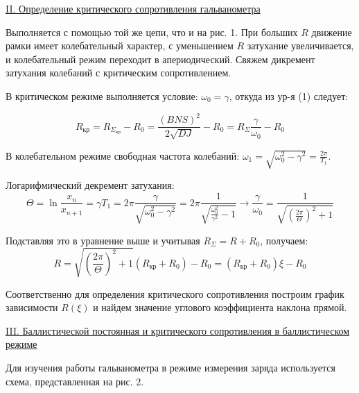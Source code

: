 \documentclass[a4paper]{article}
\begin{document}
\begin{center}
    \underline{\large {\RN{2}. Определение критического сопротивления гальванометра}}
\end{center}

Выполняется с помощью той же цепи, что и на рис. 1. При больших $R$ движение рамки имеет колебательный характер, с уменьшением $R$ затухание увеличивается, и колебательный режим переходит в апериодический. Свяжем дикремент затухания колебаний с критическим сопротивлением. \par

В критическом режиме выполняется условие: \(\omega_{0} = \gamma\), откуда из ур-я (1) следует:

\begin{equation*}
    R_{\text{кр}} = R_{\Sigma_{\text{кр}}} - R_{0} = \frac{(BNS)^{2}}{2\sqrt{DJ}} - R_{0} = R_{\Sigma} \frac{\gamma}{\omega_{0}} - R_{0}
\end{equation*}

В колебательном режиме свободная частота колебаний: \(\omega_{1} = \sqrt{\omega_{0}^{2} - \gamma^{2}} = \frac{2\pi}{T_{1}}\).

Логарифмический декремент затухания:
\begin{equation*}
    \Theta = \ln{\frac{x_{n}}{x_{n+1}}} = \gamma T_{1} = 2\pi \frac{\gamma}{\sqrt{\omega_{0}^{2} - \gamma^{2}}} = 2\pi \frac{1}{\sqrt{\frac{\omega_{0}^{2}}{\gamma^{2}} - 1}} \rightarrow \frac{\gamma}{\omega_{0}} = \frac{1}{\sqrt{(\frac{2\pi}{\Theta})^{2} + 1}}
\end{equation*}

Подставляя это в уравнение выше и учитывая \(R_{\Sigma} = R + R_{0}\), получаем:
\begin{equation}
    R = \sqrt{\left(\frac{2\pi}{\Theta}\right)^{2} + 1} (R_{\text{кр}} + R_{0}) - R_{0} = (R_{\text{кр}} + R_{0}) \xi - R_{0} 
\end{equation}

Соответственно для определения критического сопротивления построим график зависимости \(R(\xi)\) и найдем значение углового коэффициента наклона прямой.

\newpage

\begin{center}
    \underline{\large {\RN{3}. Баллистической постоянная и критического сопротивления в баллистическом режиме}}
\end{center}

Для изучения работы гальванометра в режиме измерения заряда используется схема, представленная на рис. 2.
\end{document}
